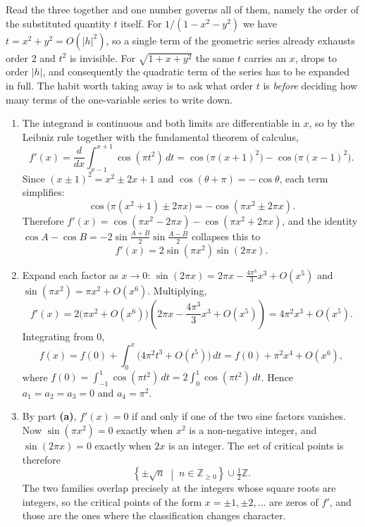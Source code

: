 \begin{remark}
Read the three together and one number governs all of them, namely the order of the substituted
quantity $t$ itself. For $1/(1-x^2-y^2)$ we have $t = x^2+y^2 = O(|h|^2)$, so a single term of the
geometric series already exhausts order $2$ and $t^2$ is invisible. For $\sqrt{1+x+y^2}$ the same
$t$ carries an $x$, drops to order $|h|$, and consequently the quadratic term of the series has to
be expanded in full. The habit worth taking away is to ask what order $t$ is \emph{before}
deciding how many terms of the one-variable series to write down.
\end{remark}

\begin{exercisesolution}
\label{sol:taylor_parametric_integral}
\begin{enumerate}[label=\textbf{(\alph*)}]
  \item The integrand is continuous and both limits are differentiable in $x$, so by the Leibniz
    rule together with the fundamental theorem of calculus,
\[f'(x) = \frac{d}{dx} \int_{x-1}^{x+1} \cos(\pi t^2) \, dt = \cos\big(\pi (x+1)^2\big) - \cos\big(\pi (x-1)^2\big).\]
Since $(x\pm1)^2 = x^2 \pm 2x + 1$ and $\cos(\theta+\pi) = -\cos\theta$, each term simplifies:
\[\cos\big(\pi(x^2+1) \pm 2\pi x\big) = -\cos(\pi x^2 \pm 2\pi x).\]
Therefore $f'(x) = \cos(\pi x^2 - 2\pi x) - \cos(\pi x^2 + 2\pi x)$, and the identity
$\cos A - \cos B = -2\sin\frac{A+B}{2}\sin\frac{A-B}{2}$ collapses this to
\[f'(x) = 2 \sin(\pi x^2) \sin(2\pi x).\]

  \item Expand each factor as $x \to 0$: $\sin(2\pi x) = 2\pi x - \frac{4\pi^3}{3} x^3 + O(x^5)$ and
    $\sin(\pi x^2) = \pi x^2 + O(x^6)$. Multiplying,
\[f'(x) = 2 \big(\pi x^2 + O(x^6)\big)\left(2\pi x - \frac{4\pi^3}{3}x^3 + O(x^5)\right) = 4\pi^2 x^3 + O(x^5).\]
Integrating from $0$,
\[f(x) = f(0) + \int_0^x \big(4\pi^2 t^3 + O(t^5)\big)\,dt = f(0) + \pi^2 x^4 + O(x^6),\]
where $f(0) = \int_{-1}^1 \cos(\pi t^2)\,dt = 2\int_0^1 \cos(\pi t^2)\,dt$. Hence
$a_1 = a_2 = a_3 = 0$ and $a_4 = \pi^2$.

  \item By part \textbf{(a)}, $f'(x) = 0$ if and only if one of the two sine factors vanishes.
    Now $\sin(\pi x^2) = 0$ exactly when $x^2$ is a non-negative integer, and $\sin(2\pi x) = 0$
    exactly when $2x$ is an integer. The set of critical points is therefore
\[\left\{\pm\sqrt{n} \;\middle|\; n \in \mathbb{Z}_{\geq 0}\right\} \cup \tfrac{1}{2}\mathbb{Z}.\]
    The two families overlap precisely at the integers whose square roots are integers, so the
    critical points of the form $x = \pm 1, \pm 2, \dots$ are  zeros of $f'$, and
    those are the ones where the classification changes character.


\end{enumerate}
\end{exercisesolution}
